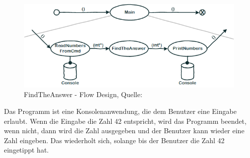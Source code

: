 \begin{figure}[H]
	\centering
	\includegraphics[width=\linewidth]{./img/FlowDesign2.png}
	\caption{FindTheAnswer - Flow Design, Quelle: \cite{CODEWHISPERER}}
\end{figure}



\bigskip
Das Programm ist eine Konsolenanwendung, die dem Benutzer eine Eingabe erlaubt.
Wenn die Eingabe die Zahl 42 entspricht, wird das Programm beendet, wenn nicht,
dann wird die Zahl ausgegeben und der Benutzer kann wieder eine Zahl eingeben.
Das wiederholt sich, solange bis der Benutzer die Zahl 42 eingetippt hat.


